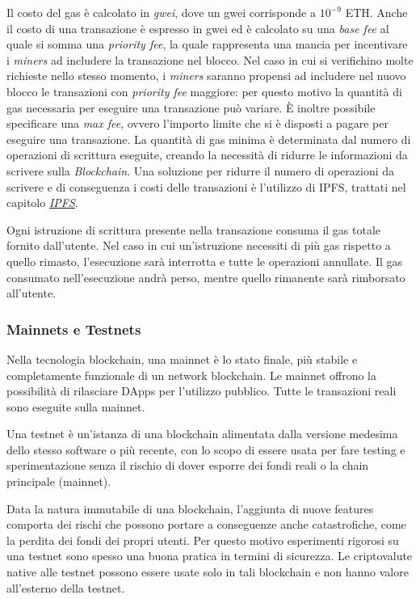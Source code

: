Il costo del gas è calcolato in \textit{gwei}, dove un gwei corrisponde a $10^{-9}$ ETH.
Anche il costo di una transazione è espresso in gwei ed è calcolato su una \textit{base fee} al quale si somma una \textit{priority fee}, la quale rappresenta una mancia per incentivare i \textit{miners} ad includere la transazione nel blocco.
Nel caso in cui si verifichino molte richieste nello stesso momento, i \textit{miners} saranno propensi ad includere nel nuovo blocco le transazioni con \textit{priority fee} maggiore: per questo motivo la quantità di gas necessaria per eseguire una transazione può variare.
È inoltre possibile specificare una \textit{max fee}, ovvero l'importo limite che si è disposti a pagare per eseguire una transazione.
La quantità di gas minima è determinata dal numero di operazioni di scrittura eseguite, creando la necessità di ridurre le informazioni da scrivere sulla \textit{Blockchain}.
Una soluzione per ridurre il numero di operazioni da scrivere e di conseguenza i costi delle transazioni è l'utilizzo di IPFS, trattati nel capitolo \hyperref[sec:ipfs]{\textit{IPFS}}.

Ogni istruzione di scrittura presente nella transazione consuma il gas totale fornito dall'utente.
Nel caso in cui un'istruzione necessiti di più gas rispetto a quello rimasto, l'esecuzione sarà interrotta e tutte le operazioni annullate.
Il gas consumato nell'esecuzione andrà perso, mentre quello rimanente sarà rimborsato all'utente.

\subsubsection{Mainnets e Testnets}
\label{sec:mainnet-testnet}

Nella tecnologia blockchain, una mainnet è lo stato finale, più stabile e completamente funzionale di un network blockchain.
Le mainnet offrono la possibilità di rilasciare DApps per l'utilizzo pubblico.
Tutte le transazioni reali sono eseguite sulla mainnet. \cite{testnet-vs-mainnet-shardeum}

Una testnet è un'istanza di una blockchain alimentata dalla versione medesima dello stesso software o più recente, con lo scopo di essere usata per fare testing e sperimentazione senza il rischio di dover esporre dei fondi reali o la chain principale (mainnet). \cite{testnet-wikipedia}

Data la natura immutabile di una blockchain, l'aggiunta di nuove features comporta dei rischi che possono portare a conseguenze anche catastrofiche, come la perdita dei fondi dei propri utenti.
Per questo motivo esperimenti rigorosi su una testnet sono spesso una buona pratica in termini di sicurezza.
Le criptovalute native alle testnet possono essere usate solo in tali blockchain e non hanno valore all'esterno della testnet.

